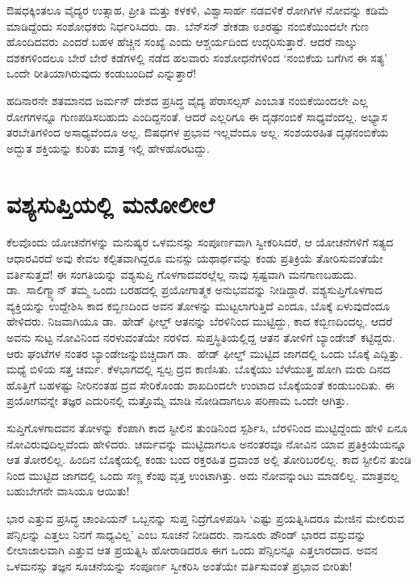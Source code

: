 ಔಷಧಕ್ಕಿಂತಲೂ ವೈದ್ಯರ ಉತ್ಸಾಹ, ಪ್ರೀತಿ ಮತ್ತು ಕಳಕಳಿ, ವಿಶ್ವಾಸಾರ್ಹ ನಡವಳಿಕೆ ರೋಗಿಗಳ ನೋವನ್ನು ಕಡಿಮೆ ಮಾಡಿದ್ದೆಂದು ಸಂಶೋಧಕರು ನಿರ್ಧರಿಸಿದರು. ಡಾ.\ ಬೆನ್​ಸನ್ ಶೇಕಡಾ ೮೨ರಷ್ಟು ನಂಬಿಕೆಯಿಂದಲೇ ಗುಣ ಹೊಂದಿದವರು ಎಂದರೆ ಬಹಳ ಹೆಚ್ಚಿನ ಸಂಖ್ಯೆ ಎಂದು ಆಶ್ಚರ್ಯದಿಂದ ಉದ್ಗರಿಸುತ್ತಾರೆ. ಆದರೆ ನಾಲ್ಕು ದಶಕಗಳಿಂದಲೂ ಬೇರೆ ಬೇರೆ ಕಡೆಗಳಲ್ಲಿ ನಡೆದ ಹಲವಾರು ಸಂಶೋಧನೆಗಳಿಂದ ‘ನಂಬಿಕೆಯ ಬಗೆಗಿನ ಈ ಸತ್ಯ’ ಒಂದೇ ರೀತಿಯಾಗಿರುವುದು ಕಂಡುಬಂದಿದೆ ಎನ್ನುತ್ತಾರೆ!

ಹದಿನಾರನೇ ಶತಮಾನದ ಜರ್ಮನ್ ದೇಶದ ಪ್ರಸಿದ್ಧ ವೈದ್ಯ ಪೆರಾಸಲ್ಸಸ್ ಎಂಬಾತ ನಂಬಿಕೆ\-ಯಿಂದಲೇ ಎಲ್ಲ ರೋಗಗಳನ್ನೂ ಗುಣಪಡಿಸಬಹುದು ಎಂದಿದ್ದನಂತೆ. ಆದರೆ ಎಲ್ಲರಿಗೂ ಈ ದೃಢನಂಬಿಕೆ ಸಾಧ್ಯವೆಂದಲ್ಲ. ಅಭ್ಯಾಸ ತರಬೇತಿಗಳಿಂದ ಅಸಾಧ್ಯವೆಂದೂ ಅಲ್ಲ. ಔಷಧಗಳ ಪ್ರಭಾವ ಇಲ್ಲವೆಂದೂ ಅಲ್ಲ. ಸಂಶಯರಹಿತ ದೃಢನಂಬಿಕೆಯ ಅದ್ಭುತ ಶಕ್ತಿಯನ್ನು ಕುರಿತು ಮಾತ್ರ ಇಲ್ಲಿ ಹೇಳಹೊರಟದ್ದು.


\section*{ವಶ್ಯಸುಪ್ತಿಯಲ್ಲಿ ಮನೋಲೀಲೆ}

\vskip -7pt

ಕೆಲವೊಂದು ಯೋಚನೆಗಳನ್ನು ಮನುಷ್ಯರ ಒಳಮನಸ್ಸು ಸಂಪೂರ್ಣವಾಗಿ ಸ್ವೀಕರಿಸಿದರೆ, ಆ ಯೋಚನೆಗಳಿಗೆ ಸತ್ಯದ ಆಧಾರವಿರದೆ ಅವು ಕೇವಲ ಕಲ್ಪಿತವಾಗಿದ್ದರೂ ಮನಸ್ಸು ಯಥಾರ್ಥವನ್ನು ಕಂಡು ಪ್ರತಿಕ್ರಿಯೆ ತೋರಿಸುವಂತೆಯೇ ವರ್ತಿಸುತ್ತದೆ! ಈ ಸಂಗತಿಯನ್ನು ವಶ್ಯಸುಪ್ತಿ ಗೊಳಗಾದವರಲ್ಲೆಲ್ಲ ನಾವು ಸ್ಪಷ್ಟವಾಗಿ ಮನಗಾಣಬಹುದು. ಡಾ.\ ಸಾಲಿಗ್ಮ್ಯಾನ್ ತಮ್ಮ ಒಂದು ಬರಹದಲ್ಲಿ ಪ್ರಯೋಗಾತ್ಮಕ ಅನುಭವವನ್ನು ನೀಡಿದ್ದಾರೆ. ವಶ್ಯಸುಪ್ತಿಗೊಳಗಾದ ವ್ಯಕ್ತಿಯನ್ನು ಉದ್ದೇಶಿಸಿ ಕಾದ ಕಬ್ಬಿಣದಿಂದ ಅವನ ತೋಳನ್ನು ಮುಟ್ಟಲಾಗುತ್ತಿದೆ ಎಂದೂ, ಬೊಕ್ಕೆ ಏಳುವುದೆಂದೂ ಹೇಳಿದರು. ನಿಜವಾಗಿಯೂ ಡಾ.\ ಹೇಡ್ ಫೀಲ್ಡ್ ಆತನನ್ನು ಬೆರಳಿನಿಂದ ಮುಟ್ಟಿದ್ದು, ಕಾದ ಕಬ್ಬಿಣದಿಂದಲ್ಲ. ಆದರೆ ಅವನು ಸುಟ್ಟ ನೋವಿನಿಂದ ನರಳುವಂತೆಯೇ ನರಳಿದ. ಸುಪ್ತಸ್ಥಿತಿಯಲ್ಲಿದ್ದ ಆತನ ತೋಳಿಗೆ ಬ್ಯಾಂಡೇಜ್ ಕಟ್ಟಿದ್ದರು. ಆರು ಘಂಟೆಗಳ ನಂತರ ಬ್ಯಾಂಡೇಜನ್ನು\break ಬಿಚ್ಚಿದಾಗ ಡಾ.\ ಹೇಡ್ ಫೀಲ್ಡ್ ಮುಟ್ಟಿದ ಜಾಗದಲ್ಲಿ ಒಂದು ಬೊಕ್ಕೆ ಎದ್ದಿತ್ತು. ಮಧ್ಯೆ ಬಿಳಿಯ ಸತ್ತ ಚರ್ಮ. ಕೆಳಭಾಗದಲ್ಲಿ ಸ್ವಲ್ಪ ದ್ರವ ಕಾಣಿಸಿತು. ಬೊಕ್ಕೆಯು ಬೆಳೆಯುತ್ತ ಹೋಗಿ ಮರು ದಿನದ ಹೊತ್ತಿಗೆ ಬಹಳಷ್ಟು ನೀರಿನಂತಹ ದ್ರವ ಸೇರಿಕೊಂಡು ಶಾಖದಿಂದಲೇ ಉಂಟಾದ ಬೊಕ್ಕೆಯಂತೆ ಕಂಡುಬಂದಿತು. ಈ ಪ್ರಯೋಗವನ್ನೇ ತಜ್ಞರ ಎದುರಿನಲ್ಲಿ ಮತ್ತೊಮ್ಮೆ ಮಾಡಿ ನೋಡಿದಾಗಲೂ ಪರಿಣಾಮ ಒಂದೇ ಆಗಿತ್ತು.

ಸುಪ್ತಿಗೊಳಗಾದವನ ತೋಳನ್ನು ಕೆಂಪಾಗಿ ಕಾದ ಸ್ಟೀಲಿನ ತುಂಡಿನಿಂದ ಸ್ಪರ್ಶಿಸಿ, ಬೆರಳಿನಿಂದ ಮುಟ್ಟಿದ್ದೆಂದು ಹೇಳಿ ಏನೂ ನೋವಿರುವುದಿಲ್ಲವೆಂದು ಹೇಳಿದರು. ಚರ್ಮವನ್ನು ಮುಟ್ಟಿದಾಗಲೂ ಅನಂತರವೂ ನೋವಿನ ಯಾವ ಪ್ರತಿಕ್ರಿಯೆಯನ್ನೂ ಆತ ತೋರಲಿಲ್ಲ. ಹಿಂದಿನ ಬೊಕ್ಕೆಯಲ್ಲಿ ಕಂಡು ಬಂದ ರಕ್ತರಹಿತ ದ್ರವಾಂಶ ಅಲ್ಲಿ ತೋರಿಬರಲಿಲ್ಲ. ಕಾದ ಸ್ಟೀಲಿನ ತುಂಡಿ ನಿಂದ ಮುಟ್ಟಿದ ಜಾಗದಲ್ಲಿ ಒಂದು ಸಣ್ಣ ಕೆಂಪು ವೃತ್ತ ಉಂಟಾಗಿತ್ತು. ಅದು ನೋವನ್ನುಂಟು ಮಾಡಲಿಲ್ಲ. ಮಾತ್ರವಲ್ಲ ಬಹುಬೇಗನೇ ವಾಸಿಯೂ ಆಯಿತು!

ಭಾರ ಎತ್ತುವ ಪ್ರಸಿದ್ಧ ಚಾಂಪಿಯನ್ ಒಬ್ಬನನ್ನು ಸುಪ್ತ ನಿದ್ರೆಗೊಳಪಡಿಸಿ ‘ಎಷ್ಟು ಪ್ರಯತ್ನಿ\-ಸಿದರೂ ಮೇಜಿನ ಮೇಲಿರುವ ಪೆನ್ಸಿಲನ್ನು ಎತ್ತಲು ನಿನಗೆ ಸಾಧ್ಯವಿಲ್ಲ’ ಎಂಬ ಸೂಚನೆ ನೀಡಿದರು. ನಾನೂರು ಪೌಂಡ್ ಭಾರದ ವಸ್ತುವನ್ನು ಲೀಲಾಜಾಲವಾಗಿ ಎತ್ತುವ ಆತ ಪ್ರಯತ್ನಿಸಿ ಹೋರಾಡಿದರೂ ಈಗ ಒಂದು ಪೆನ್ಸಿಲನ್ನೂ ಎತ್ತಲಾರದಾದ. ಅವನ ಒಳಮನಸ್ಸು ತಜ್ಞನ ಸೂಚನೆಯನ್ನು ಸಂಪೂರ್ಣ ಸ್ವೀಕರಿಸಿ ಅಂತೆಯೇ ವರ್ತಿಸುವಂತೆ ಪ್ರಭಾವ ಬೀರಿತು!

